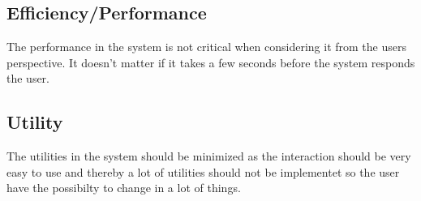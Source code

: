 \subsection{Efficiency/Performance}
The performance in the system is not critical when considering it from the users
perspective. It doesn't matter if it takes a few seconds before the system
responds the user.
\subsection{Utility}
The utilities in the system should be minimized as the interaction should be
very easy to use and thereby a lot of utilities should not be implementet so the
user have the possibilty to change in a lot of things.
